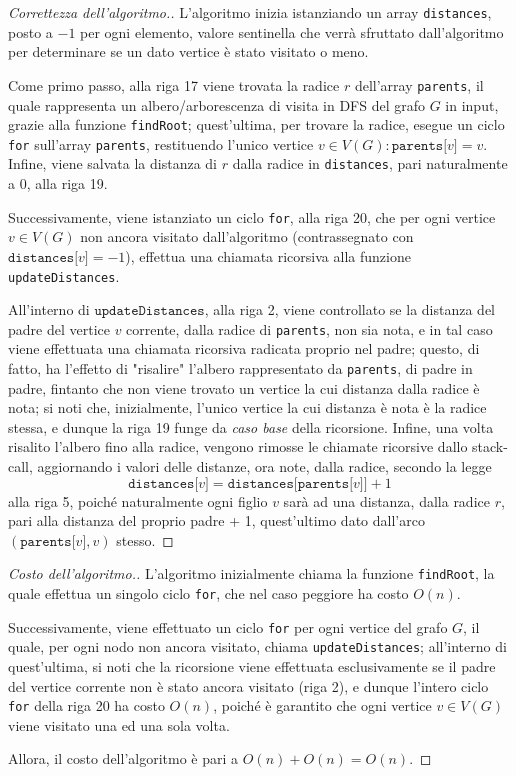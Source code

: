 \documentclass[a4paper, 12pt]{report}
\begin{document}
    \begin{proof}[Correttezza dell'algoritmo.]
        L'algoritmo inizia istanziando un array \texttt{distances}, posto a $-1$ per ogni elemento, valore sentinella che verrà sfruttato dall'algoritmo per determinare se un dato vertice è stato visitato o meno.

        Come primo passo, alla riga 17 viene trovata la radice $r$ dell'array \texttt{parents}, il quale rappresenta un albero/arborescenza di visita in DFS del grafo $G$ in input, grazie alla funzione \texttt{findRoot}; quest'ultima, per trovare la radice, esegue un ciclo \texttt{for} sull'array \texttt{parents}, restituendo l'unico vertice $v \in V(G) : \texttt{parents[}v\texttt{]} = v$. Infine, viene salvata la distanza di $r$ dalla radice in \texttt{distances}, pari naturalmente a 0, alla riga 19.

        Successivamente, viene istanziato un ciclo \texttt{for}, alla riga 20, che per ogni vertice $v \in V(G)$ non ancora visitato dall'algoritmo (contrassegnato con $\texttt{distances[}v\texttt{]} = -1$), effettua una chiamata ricorsiva alla funzione \texttt{updateDistances}.

        All'interno di $\texttt{updateDistances}$, alla riga 2, viene controllato se la distanza del padre del vertice $v$ corrente, dalla radice di \texttt{parents}, non sia nota, e in tal caso viene effettuata una chiamata ricorsiva radicata proprio nel padre; questo, di fatto, ha l'effetto di "risalire" l'albero rappresentato da \texttt{parents}, di padre in padre, fintanto che non viene trovato un vertice la cui distanza dalla radice è nota; si noti che, inizialmente, l'unico vertice la cui distanza è nota è la radice stessa, e dunque la riga 19 funge da \textit{caso base} della ricorsione. Infine, una volta risalito l'albero fino alla radice, vengono rimosse le chiamate ricorsive dallo stack-call, aggiornando i valori delle distanze, ora note, dalla radice, secondo la legge $$\texttt{distances[}v\texttt{]} = \texttt{distances[parents[}v\texttt{]]} + 1$$ alla riga 5, poiché naturalmente ogni figlio $v$ sarà ad una distanza, dalla radice $r$, pari alla distanza del proprio padre + 1, quest'ultimo dato dall'arco $(\texttt{parents[}v\texttt{]}, v)$ stesso.
    \end{proof}

    \begin{proof}[Costo dell'algoritmo.]
        L'algoritmo inizialmente chiama la funzione \texttt{findRoot}, la quale effettua un singolo ciclo \texttt{for}, che nel caso peggiore ha costo $O(n)$.

        Successivamente, viene effettuato un ciclo \texttt{for} per ogni vertice del grafo $G$, il quale, per ogni nodo non ancora visitato, chiama \texttt{updateDistances}; all'interno di quest'ultima, si noti che la ricorsione viene effettuata esclusivamente se il padre del vertice corrente non è stato ancora visitato (riga 2), e dunque l'intero ciclo \texttt{for} della riga 20 ha costo $O(n)$, poiché è garantito che ogni vertice $v \in V(G)$ viene visitato una ed una sola volta.

        Allora, il costo dell'algoritmo è pari a $O(n) + O(n) = O(n)$.
    \end{proof}
\end{document}

